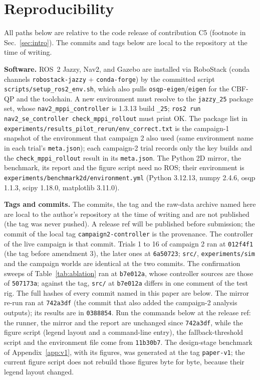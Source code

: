\documentclass[journal]{IEEEtran}
\begin{document}
\appendices

\section{Reproducibility}
\label{sec:repro}
\raggedright

All paths below are relative to the code release of contribution C5 (footnote in
Sec.~\ref{sec:intro}). The commits and tags below are local to the repository at the time
of writing.

\textbf{Software.} ROS~2 Jazzy, Nav2, and Gazebo are installed via RoboStack (conda
channels \texttt{robostack-jazzy} + \texttt{conda-forge}) by the committed script
\texttt{scripts/setup\_ros2\_env.sh}, which also pulls \texttt{osqp-eigen}/\texttt{eigen}
for the CBF-QP \cite{osqp} and the toolchain. A new environment must resolve to the
\texttt{jazzy\_25} package set, whose \texttt{nav2\_mppi\_controller} is 1.3.13 build
\texttt{\_25}; \texttt{ros2 run nav2\_se\_controller check\_mppi\_rollout} must print OK.
The package list in
\texttt{experiments/results\_pilot\_rerun/}\allowbreak\texttt{env\_correct.txt} is the campaign-1
snapshot of the environment that campaign 2 also used (same environment name in each trial's
\texttt{meta.json}); each campaign-2 trial records only the key builds and the
\texttt{check\_mppi\_rollout} result in its \texttt{meta.json}. The Python 2D mirror, the benchmark,
its report and the figure script need no ROS; their environment is
\texttt{experiments/benchmark2d/environment.yml} (Python 3.12.13, numpy 2.4.6, osqp 1.1.3,
scipy 1.18.0, matplotlib 3.11.0).

\textbf{Tags and commits.} The commits, the tag and the raw-data archive named here are local
to the author's repository at the time of writing and are not published (the tag was never
pushed). A release ref will be published before submission; the commit of the local tag
\texttt{campaign2-controller} is the provenance. The controller of the live campaign is that
commit. Trials 1 to 16 of campaign 2 ran at \texttt{012f4f1} (the tag before amendment 3), the
later ones at \texttt{6a50723}; \texttt{src/}, \texttt{experiments/sim} and the campaign worlds
are identical at the two commits. The confirmation sweeps of Table~\ref{tab:ablation} ran at
\texttt{b7e012a}, whose controller sources are those of \texttt{507173a}; against the tag,
\texttt{src/} at \texttt{b7e012a} differs in one comment of the test rig. The full hashes of
every commit named in this paper are below. The mirror re-run ran at \texttt{742a3df} (the commit
that also added the campaign-2 analysis outputs); its results are in \texttt{0388854}. Run the commands below at the release ref:
the runner, the mirror and the report are unchanged since \texttt{742a3df}, while the figure
script (legend layout and a command-line entry), the fallback-threshold script and the
environment file come from \texttt{11b30b7}. The design-stage benchmark of
Appendix~\ref{app:v1}, with its figures, was generated at the tag \texttt{paper-v1}; the current
figure script does not rebuild those figures byte for byte, because their legend layout
changed.
\end{document}
